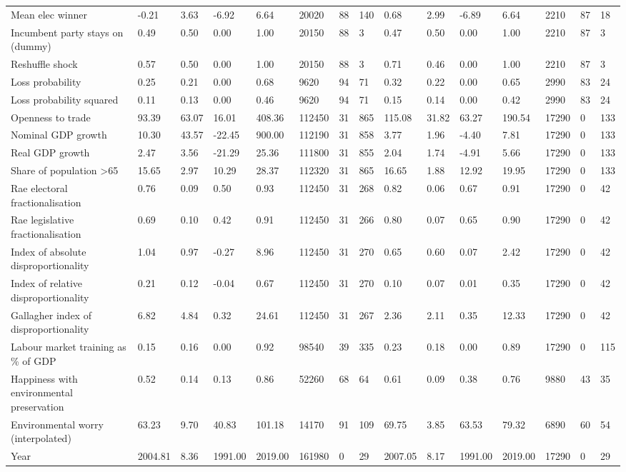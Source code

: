 \begin{longtable}{lllllllllllllll}
Mean elec winner & -0.21 & 3.63 & -6.92 & 6.64 & 20020 & 88 & 140 & 0.68 & 2.99 & -6.89 & 6.64 & 2210 & 87 & 18\\
Incumbent party stays on (dummy) & 0.49 & 0.50 & 0.00 & 1.00 & 20150 & 88 & 3 & 0.47 & 0.50 & 0.00 & 1.00 & 2210 & 87 & 3\\
Reshuffle shock & 0.57 & 0.50 & 0.00 & 1.00 & 20150 & 88 & 3 & 0.71 & 0.46 & 0.00 & 1.00 & 2210 & 87 & 3\\
Loss probability & 0.25 & 0.21 & 0.00 & 0.68 & 9620 & 94 & 71 & 0.32 & 0.22 & 0.00 & 0.65 & 2990 & 83 & 24\\
\addlinespace
Loss probability squared & 0.11 & 0.13 & 0.00 & 0.46 & 9620 & 94 & 71 & 0.15 & 0.14 & 0.00 & 0.42 & 2990 & 83 & 24\\
Openness to trade & 93.39 & 63.07 & 16.01 & 408.36 & 112450 & 31 & 865 & 115.08 & 31.82 & 63.27 & 190.54 & 17290 & 0 & 133\\
Nominal GDP growth & 10.30 & 43.57 & -22.45 & 900.00 & 112190 & 31 & 858 & 3.77 & 1.96 & -4.40 & 7.81 & 17290 & 0 & 133\\
Real GDP growth & 2.47 & 3.56 & -21.29 & 25.36 & 111800 & 31 & 855 & 2.04 & 1.74 & -4.91 & 5.66 & 17290 & 0 & 133\\
Share of population >65 & 15.65 & 2.97 & 10.29 & 28.37 & 112320 & 31 & 865 & 16.65 & 1.88 & 12.92 & 19.95 & 17290 & 0 & 133\\
\addlinespace
Rae electoral fractionalisation & 0.76 & 0.09 & 0.50 & 0.93 & 112450 & 31 & 268 & 0.82 & 0.06 & 0.67 & 0.91 & 17290 & 0 & 42\\
Rae legislative fractionalisation & 0.69 & 0.10 & 0.42 & 0.91 & 112450 & 31 & 266 & 0.80 & 0.07 & 0.65 & 0.90 & 17290 & 0 & 42\\
Index of absolute disproportionality & 1.04 & 0.97 & -0.27 & 8.96 & 112450 & 31 & 270 & 0.65 & 0.60 & 0.07 & 2.42 & 17290 & 0 & 42\\
Index of relative disproportionality & 0.21 & 0.12 & -0.04 & 0.67 & 112450 & 31 & 270 & 0.10 & 0.07 & 0.01 & 0.35 & 17290 & 0 & 42\\
Gallagher index of disproportionality & 6.82 & 4.84 & 0.32 & 24.61 & 112450 & 31 & 267 & 2.36 & 2.11 & 0.35 & 12.33 & 17290 & 0 & 42\\
\addlinespace
Labour market training as \% of GDP & 0.15 & 0.16 & 0.00 & 0.92 & 98540 & 39 & 335 & 0.23 & 0.18 & 0.00 & 0.89 & 17290 & 0 & 115\\
Happiness with environmental preservation & 0.52 & 0.14 & 0.13 & 0.86 & 52260 & 68 & 64 & 0.61 & 0.09 & 0.38 & 0.76 & 9880 & 43 & 35\\
Environmental worry (interpolated) & 63.23 & 9.70 & 40.83 & 101.18 & 14170 & 91 & 109 & 69.75 & 3.85 & 63.53 & 79.32 & 6890 & 60 & 54\\
Year & 2004.81 & 8.36 & 1991.00 & 2019.00 & 161980 & 0 & 29 & 2007.05 & 8.17 & 1991.00 & 2019.00 & 17290 & 0 & 29\\
\bottomrule
\end{longtable}
